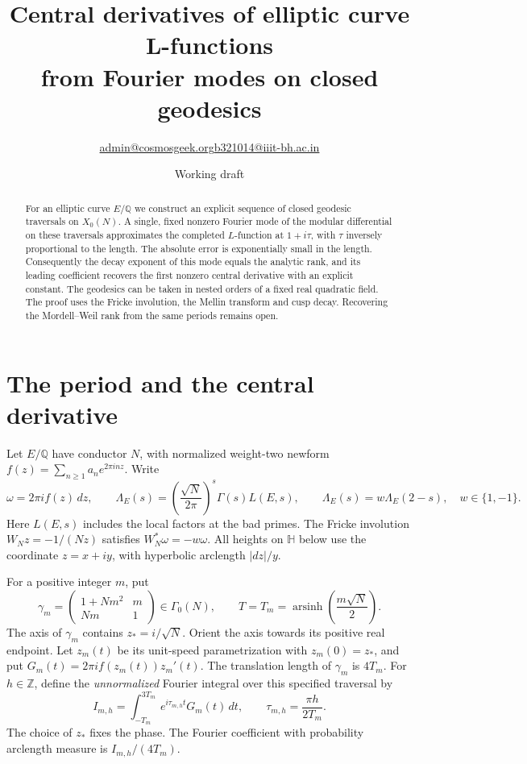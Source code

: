 \documentclass[11pt]{article}
\title{Central derivatives of elliptic curve L-functions\\
from Fourier modes on closed geodesics}
\author{\small \href{mailto:admin@cosmosgeek.org}{admin@cosmosgeek.org}\qquad \href{mailto:b321014@iiit-bh.ac.in}{b321014@iiit-bh.ac.in}}
\date{Working draft}
\newcommand{\HH}{\mathbb H}
\newcommand{\Z}{\mathbb Z}
\newcommand{\Q}{\mathbb Q}
\DeclareMathOperator{\arsinh}{arsinh}
\begin{document}
\maketitle

\begin{abstract}
For an elliptic curve \(E/\Q\) we construct an explicit sequence of closed
geodesic traversals on \(X_0(N)\). A single, fixed nonzero Fourier mode of the
modular differential on these traversals approximates the completed
\(L\)-function at \(1+i\tau\), with \(\tau\) inversely proportional to the
length. The absolute error is exponentially small in the length. Consequently
the decay exponent of this mode equals the analytic rank, and its leading
coefficient recovers the first nonzero central derivative with an explicit
constant. The geodesics can be taken in nested orders of a fixed real
quadratic field. The proof uses the Fricke involution, the Mellin transform
and cusp decay. Recovering the Mordell--Weil rank from the same periods
remains open.
\end{abstract}

\section{The period and the central derivative}

Let \(E/\Q\) have conductor \(N\), with normalized weight-two newform
\(f(z)=\sum_{n\ge1}a_n e^{2\pi i n z}\). Write
\[
 \omega=2\pi i f(z)\,dz,\qquad
 \Lambda_E(s)=\left(\frac{\sqrt N}{2\pi}\right)^s\Gamma(s)L(E,s),
 \qquad \Lambda_E(s)=w\Lambda_E(2-s),\quad w\in\{1,-1\}.
\]
Here \(L(E,s)\) includes the local factors at the bad primes. The Fricke
involution \(W_N z=-1/(Nz)\) satisfies \(W_N^*\omega=-w\omega\).
All heights on \(\HH\) below use the coordinate \(z=x+iy\), with hyperbolic
arclength \(|dz|/y\).

For a positive integer \(m\), put
\[
 \gamma_m=\begin{pmatrix}1+Nm^2&m\\Nm&1\end{pmatrix}\in\Gamma_0(N),
 \qquad T=T_m=\arsinh\!\left(\frac{m\sqrt N}{2}\right).
\]
The axis of \(\gamma_m\) contains \(z_*=i/\sqrt N\). Orient the axis
towards its positive real endpoint. Let \(z_m(t)\) be its unit-speed
parametrization with \(z_m(0)=z_*\), and put
\(G_m(t)=2\pi i f(z_m(t))z_m'(t)\).
The translation length of \(\gamma_m\) is \(4T_m\).
For \(h\in\Z\), define the \emph{unnormalized} Fourier integral over this
specified traversal by
\begin{equation}
 I_{m,h}=\int_{-T_m}^{3T_m} e^{i\tau_{m,h}t} G_m(t)\,dt,
 \qquad \tau_{m,h}=\frac{\pi h}{2T_m}.
 \label{eq:period}
\end{equation}
The choice of \(z_*\) fixes the phase. The Fourier coefficient with probability
arclength measure is \(I_{m,h}/(4T_m)\).
\end{document}
